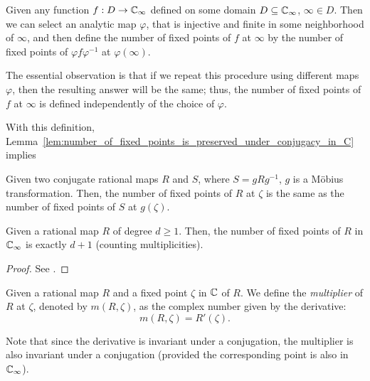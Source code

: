 \begin{definition}
    Given any function $f : D \to \mathbb{C}_\infty$ defined on some domain $D \subseteq
    \mathbb{C}_\infty$, $\infty \in D$. Then we can select an analytic map $\varphi$, that
    is injective and finite in some neighborhood of $\infty$, and then define
    the number of fixed points of $f$ at $\infty$ by the number of fixed points
    of $\varphi f \varphi^{-1}$ at $\varphi(\infty)$.
\end{definition}

The essential observation is that if we repeat this procedure using different
maps $\varphi$, then the resulting answer will be the same; thus, the number of
fixed points of $f$ at $\infty$ is defined independently of the choice of
$\varphi$.

With this definition,
Lemma~\ref{lem:number_of_fixed_points_is_preserved_under_conjugacy_in_C} implies

\begin{theorem}
    Given two conjugate rational maps $R$ and $S$, where $S = g R g^{-1}$, $g$
    is a Möbius transformation. Then, the number of fixed points of $R$ at
    $\zeta$ is the same as the number of fixed points of $S$ at $g(\zeta)$.
\end{theorem}

\begin{theorem}
    Given a rational map $R$ of degree $d \geq 1$. Then, the number of fixed
    points of $R$ in $\mathbb{C}_\infty$ is exactly $d + 1$ (counting multiplicities).
\end{theorem}
\begin{proof}
    See \cite[40]{Beardon1991}.
\end{proof}

\begin{definition}
    Given a rational map $R$ and a fixed point $\zeta$ in $\mathbb{C}$ of $R$. We define
    the \emph{multiplier} of $R$ at $\zeta$, denoted by $m(R, \zeta)$, as the
    complex number given by the derivative:
    \begin{equation*}
        m(R, \zeta) = R'(\zeta).
    \end{equation*}
\end{definition}

\begin{remark}
    Note that since the derivative is invariant under a conjugation, the
    multiplier is also invariant under a conjugation (provided the corresponding
    point is also in $\mathbb{C}_\infty$).
\end{remark}

